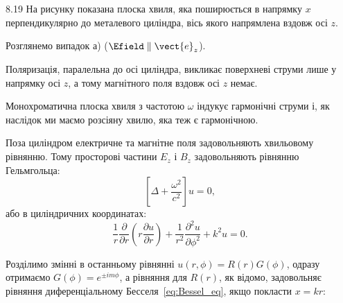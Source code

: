 \begin{Solution}{8.{19}}
	На рисунку показана плоска хвиля, яка поширюється в напрямку $x$ перпендикулярно до металевого циліндра, вісь якого напрямлена вздовж осі $z$.

	\begin{center}
	\end{center}

    Розглянемо випадок а) ($\Efield \parallel \vect{e}_z$).

	Поляризація, паралельна до осі циліндра, викликає поверхневі струми лише у напрямку осі $z$, а тому магнітного поля вздовж осі $z$ немає.
%

	Монохроматична плоска хвиля з частотою $\omega$ індукує  гармонічні струми і, як наслідок ми маємо розсіяну хвилю, яка теж є гармонічною.

	Поза циліндром електричне та магнітне поля задовольняють хвильовому рівнянню.
	Тому просторові частини $E_z$ і $B_z$ задовольняють рівнянню Гельмгольца:
	\[
		\left[ \Delta + \frac{\omega^2}{c^2}\right] u = 0,
	\]
	або в циліндричних координатах:
	\[
		\frac1r \frac{\partial }{\partial r}
		\left( r \frac{\partial u}{\partial r} \right) + \frac{1}{r^2} \frac{\partial^2 u}{\partial \phi^2} + k^2 u = 0.
	\]

	Розділимо змінні в останньому рівнянні $u(r,\phi) = R(r)G(\phi)$, одразу отримаємо $G(\phi) = e^{\pm im\phi}$, а рівняння для $R(r)$, як відомо, задовольняє рівняння диференціальному Бесселя~\eqref{eq:Bessel_eq}, якщо покласти $x = kr$:


\end{Solution}
